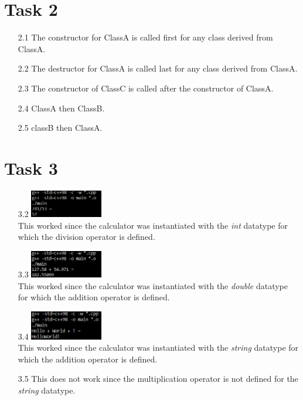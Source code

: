 \documentclass{article}
\begin{document}
\section*{Task 2}
\begin{itemize}
    \item[2.1]The constructor for ClassA is called first for any class derived from ClassA.
    \item[2.2]The destructor for ClassA is called last for any class derived from ClassA. 
    \item[2.3]The constructor of ClassC is called after the constructor of ClassA.
    \item[2.4]ClassA then ClassB.
    \item[2.5]classB then ClassA. 
\end{itemize}

\section*{Task 3}
\begin{itemize}
    \item[3.2] \includegraphics[width=0.25\textwidth]{../img/Task3_2.png}\\
                This worked since the calculator was instantiated with the \textit{int}
                datatype for which the division operator is defined.
    \item[3.3] \includegraphics[width=0.25\textwidth]{../img/Task3_3.png}\\
                This worked since the calculator was instantiated with the \textit{double}
                datatype for which the addition operator is defined.
    \item[3.4] \includegraphics[width=0.25\textwidth]{../img/Task3_4.png}\\
                This worked since the calculator was instantiated with the \textit{string}
                datatype for which the addition operator is defined.
    \item[3.5] This does not work since the multiplication operator is not defined for 
                the \textit{string} datatype.
\end{itemize}
\end{document}
